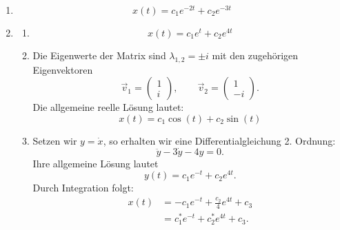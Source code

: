 \begin{enumerate}
    \item
          \[
              x(t)=c_1e^{-2t}+c_2e^{-3t}
          \]

    \item
          \begin{enumerate}
              \item
                    \[
                        x(t)=c_1e^t+c_2e^{4t}
                    \]

              \item
                    Die Eigenwerte der Matrix sind \(\lambda_{1,2}=\pm i\)
                    mit den zugehörigen Eigenvektoren
                    \[
                        \vec{v}_1=\begin{pmatrix}1\\i\end{pmatrix},
                        \qquad
                        \vec{v}_2=\begin{pmatrix}1\\-i\end{pmatrix}.
                    \]
                    Die allgemeine reelle Lösung lautet:
                    \[
                        x(t)=c_1\cos(t)+c_2\sin(t)
                    \]

              \item
                    Setzen wir \(y=\dot{x}\), so erhalten wir eine
                    Differentialgleichung 2. Ordnung:
                    \[
                        \ddot{y}-3\dot{y}-4y=0.
                    \]
                    Ihre allgemeine Lösung lautet
                    \[
                        y(t)=c_1e^{-t}+c_2e^{4t}.
                    \]
                    Durch Integration folgt:
                    \[
                        \begin{aligned}
                            x(t)
                             & = -c_1e^{-t}+\frac{c_2}{4}e^{4t}+c_3 \\
                             & = c_1^*e^{-t}+c_2^*e^{4t}+c_3.
                        \end{aligned}
                    \]
          \end{enumerate}
\end{enumerate}


























